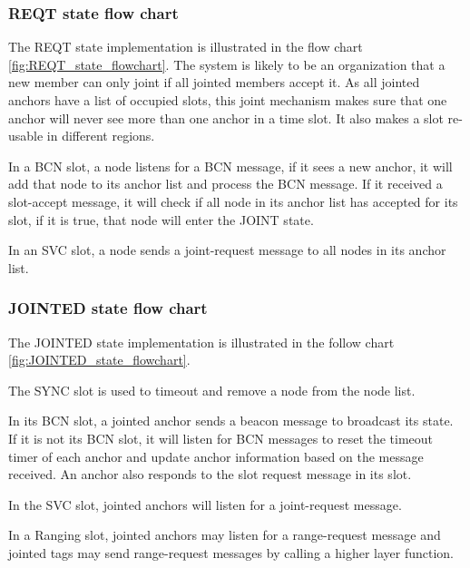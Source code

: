 \documentclass[\main/main.tex]{subfiles}
\begin{document}
\subsubsection{REQT state flow chart}
The REQT state implementation is illustrated in the flow chart \ref{fig:REQT_state_flowchart}. The system is likely to be an  organization that a new member can only joint if all jointed members accept it. As all jointed anchors have a list of occupied slots, this joint mechanism makes sure that one anchor will never see more than one anchor in a time slot. It also makes a slot re-usable in different regions.

In a BCN slot, a node listens for a BCN message, if it sees a new anchor, it will add that node to its anchor list and process the BCN message. If it received a slot-accept message, it will check if all node in its anchor list has accepted for its slot, if it is true, that node will enter the JOINT state.

In an SVC slot, a node sends a joint-request message to all nodes in its anchor list.


\subsubsection{JOINTED state flow chart}
The JOINTED state implementation is illustrated in the follow chart \ref{fig:JOINTED_state_flowchart}.

The SYNC slot is used to timeout and remove a node from the node list.

In its BCN slot, a jointed anchor sends a beacon message to broadcast its state. If it is not its BCN slot, it will listen for BCN messages to reset the timeout timer of each anchor and update anchor information based on the message received. An anchor also responds to the slot request message in its slot.

In the SVC slot, jointed anchors will listen for a joint-request message.

In a Ranging slot, jointed anchors may listen for a range-request message and jointed tags may send range-request messages by calling a higher layer function.
\end{document}
